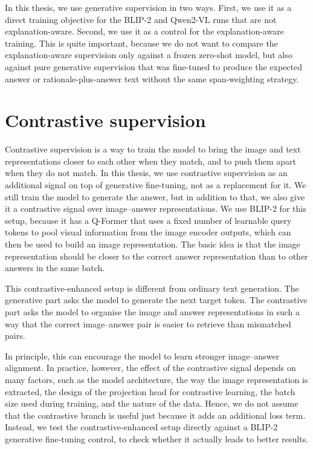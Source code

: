 \documentclass[12pt,bibliography=totoc,listof=totoc,BCOR=5mm,DIV=12,oneside,open=any]{scrbook}
\begin{document}
In this thesis, we use generative supervision in two ways.
First, we use it as a direct training objective for the BLIP-2 and Qwen2-VL runs that are not explanation-aware.
Second, we use it as a control for the explanation-aware training.
This is quite important, because we do not want to compare the explanation-aware supervision only against a frozen zero-shot model,
but also against pure generative supervision that was fine-tuned to produce the expected answer or rationale-plus-answer text without
the same span-weighting strategy. 


\section{Contrastive supervision}
Contrastive supervision is a way to train the model to bring the image and text representations closer to each other when they match,
and to push them apart when they do not match.
In this thesis, we use contrastive supervision as an additional signal on top of generative fine-tuning, not as a replacement for it.
We still train the model to generate the answer, but in addition to that, we also give it a contrastive signal over image--answer representations.
We use BLIP-2 for this setup, because it has a Q-Former that uses a fixed number of learnable query tokens to pool visual information from the image encoder outputs, which can then be used to build an image representation.
The basic idea is that the image representation should be closer to the correct answer representation than to other answers in the same batch.

This contrastive-enhanced setup is different from ordinary text generation.
The generative part asks the model to generate the next target token.
The contrastive part asks the model to organise the image and answer representations in such a way that the correct image--answer pair is easier to retrieve than mismatched pairs.

In principle, this can encourage the model to learn stronger image--answer alignment.
In practice, however, the effect of the contrastive signal depends on many factors, such as the model architecture, the way the image representation is extracted,
the design of the projection head for contrastive learning, the batch size used during training, and the nature of the data.
Hence, we do not assume that the contrastive branch is useful just because it adds an additional loss term.
Instead, we test the contrastive-enhanced setup directly against a BLIP-2 generative fine-tuning control, to check whether it actually leads to better results.
\end{document}
